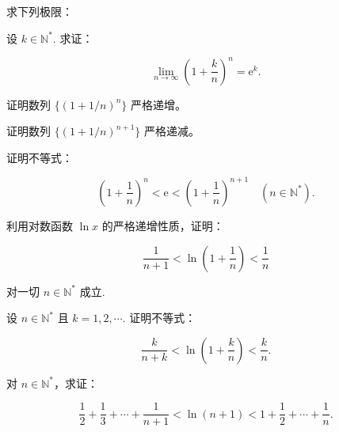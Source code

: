 \noindent\begin{minipage}{\textwidth}
求下列极限：
\end{minipage}\par\vfill
\newpage
\noindent\begin{minipage}{\textwidth}
设  $ k \in \mathbb{N}^* $. 求证：

\[\lim_{n\to\infty}\left(1+\frac{k}{n}\right)^{n}=\mathrm{e}^{k}.\]
\end{minipage}\par\vfill
\noindent\begin{minipage}{\textwidth}
证明数列 $\{(1+1/n)^n\}$ 严格递增。
\end{minipage}\par\vfill
\noindent\begin{minipage}{\textwidth}
证明数列 $\{(1+1/n)^{n+1}\}$ 严格递减。
\end{minipage}\par\vfill
\newpage
\noindent\begin{minipage}{\textwidth}
证明不等式：

\[\left(1+\frac{1}{n}\right)^{n}<\mathrm{e}<\left(1+\frac{1}{n}\right)^{n+1}\quad(n\in\mathbb{N}^{*}).\]
\end{minipage}\par\vfill
\noindent\begin{minipage}{\textwidth}
利用对数函数  $ \ln x $ 的严格递增性质，证明：

\[\frac{1}{n+1}<\ln\left(1+\frac{1}{n}\right)<\frac{1}{n}\]

对一切  $ n \in \mathbb{N}^* $ 成立.
\end{minipage}\par\vfill
\noindent\begin{minipage}{\textwidth}
设  $ n \in \mathbb{N}^* $ 且  $ k = 1, 2, \cdots $. 证明不等式：

\[\frac{k}{n+k}<\ln\left(1+\frac{k}{n}\right)<\frac{k}{n}.\]
\end{minipage}\par\vfill
\newpage
\noindent\begin{minipage}{\textwidth}
对  $ n \in \mathbb{N}^* $，求证：

\[\frac{1}{2}+\frac{1}{3}+\cdots+\frac{1}{n+1}<\ln(n+1)<1+\frac{1}{2}+\cdots+\frac{1}{n}.\]
\end{minipage}\par\vfill
